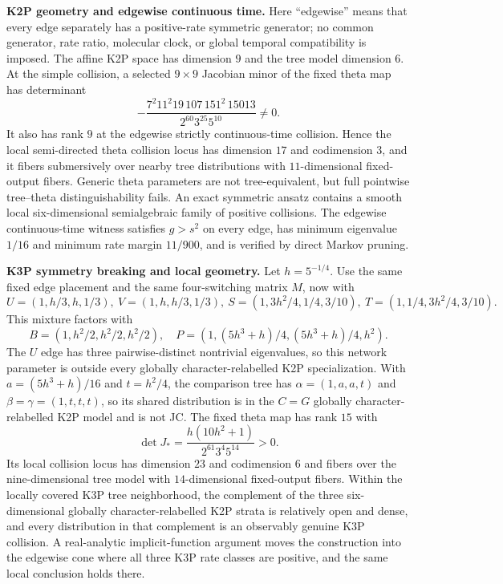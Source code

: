 \documentclass[10pt]{article}
\begin{document}
\newpage
\textbf{K2P geometry and edgewise continuous time.} Here ``edgewise'' means that every edge separately has a positive-rate symmetric generator; no common generator, rate ratio, molecular clock, or global temporal compatibility is imposed. The affine K2P space has dimension $9$ and the tree model dimension $6$. At the simple collision, a selected $9\times9$ Jacobian minor of the fixed theta map has determinant
\[
-\frac{7^2 11^2 19\,107\,151^2\,15013}{2^{60}3^{25}5^{10}}\ne0.
\]
It also has rank $9$ at the edgewise strictly continuous-time collision. Hence the local semi-directed theta collision locus has dimension $17$ and codimension $3$, and it fibers submersively over nearby tree distributions with $11$-dimensional fixed-output fibers. Generic theta parameters are not tree-equivalent, but full pointwise tree--theta distinguishability fails. An exact symmetric ansatz contains a smooth local six-dimensional semialgebraic family of positive collisions. The edgewise continuous-time witness satisfies $g>s^2$ on every edge, has minimum eigenvalue $1/16$ and minimum rate margin $11/900$, and is verified by direct Markov pruning.

\textbf{K3P symmetry breaking and local geometry.} Let $h=5^{-1/4}$. Use the same fixed edge placement and the same four-switching matrix $M$, now with
\[
U=(1,h/3,h,1/3),\ V=(1,h,h/3,1/3),\ S=(1,3h^2/4,1/4,3/10),\ T=(1,1/4,3h^2/4,3/10).
\]
This mixture factors with
\[
B=(1,h^2/2,h^2/2,h^2/2),\quad P=(1,(5h^3+h)/4,(5h^3+h)/4,h^2).
\]
The $U$ edge has three pairwise-distinct nontrivial eigenvalues, so this network parameter is outside every globally character-relabelled K2P specialization. With $a=(5h^3+h)/16$ and $t=h^2/4$, the comparison tree has $\alpha=(1,a,a,t)$ and $\beta=\gamma=(1,t,t,t)$, so its shared distribution is in the $C=G$ globally character-relabelled K2P model and is not JC. The fixed theta map has rank $15$ with
\[
\det J_*=\frac{h(10h^2+1)}{2^{61}3^4 5^{14}}>0.
\]
Its local collision locus has dimension $23$ and codimension $6$ and fibers over the nine-dimensional tree model with $14$-dimensional fixed-output fibers. Within the locally covered K3P tree neighborhood, the complement of the three six-dimensional globally character-relabelled K2P strata is relatively open and dense, and every distribution in that complement is an observably genuine K3P collision. A real-analytic implicit-function argument moves the construction into the edgewise cone where all three K3P rate classes are positive, and the same local conclusion holds there.
\end{document}
